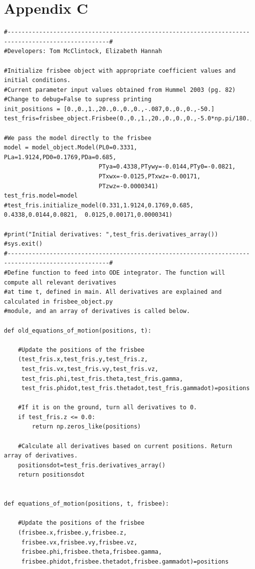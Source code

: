 \documentclass[a4paper,12pt, oneside]{article}
\begin{document}
\section*{Appendix C}
\begin{verbatim}
#---------------------------------------------------------------------------------------------------#
#Developers: Tom McClintock, Elizabeth Hannah

#Initialize frisbee object with appropriate coefficient values and initial conditions.
#Current parameter input values obtained from Hummel 2003 (pg. 82)
#Change to debug=False to supress printing
init_positions = [0.,0.,1.,20.,0.,0.,0.,-.087,0.,0.,0.,-50.]
test_fris=frisbee_object.Frisbee(0.,0.,1.,20.,0.,0.,0.,-5.0*np.pi/180.,0.,0.,0.,-50.,debug=False)

#We pass the model directly to the frisbee
model = model_object.Model(PL0=0.3331, PLa=1.9124,PD0=0.1769,PDa=0.685,
                           PTya=0.4338,PTywy=-0.0144,PTy0=-0.0821,
                           PTxwx=-0.0125,PTxwz=-0.00171,
                           PTzwz=-0.0000341)
test_fris.model=model
#test_fris.initialize_model(0.331,1.9124,0.1769,0.685,  0.4338,0.0144,0.0821,  0.0125,0.00171,0.0000341)

#print("Initial derivatives: ",test_fris.derivatives_array())
#sys.exit()
#---------------------------------------------------------------------------------------------------#
#Define function to feed into ODE integrator. The function will compute all relevant derivatives
#at time t, defined in main. All derivatives are explained and calculated in frisbee_object.py
#module, and an array of derivatives is called below.

def old_equations_of_motion(positions, t):

    #Update the positions of the frisbee
    (test_fris.x,test_fris.y,test_fris.z,
     test_fris.vx,test_fris.vy,test_fris.vz,
     test_fris.phi,test_fris.theta,test_fris.gamma,
     test_fris.phidot,test_fris.thetadot,test_fris.gammadot)=positions
    
    #If it is on the ground, turn all derivatives to 0.
    if test_fris.z <= 0.0:
        return np.zeros_like(positions)

    #Calculate all derivatives based on current positions. Return array of derivatives.
    positionsdot=test_fris.derivatives_array()
    return positionsdot


def equations_of_motion(positions, t, frisbee):

    #Update the positions of the frisbee
    (frisbee.x,frisbee.y,frisbee.z,
     frisbee.vx,frisbee.vy,frisbee.vz,
     frisbee.phi,frisbee.theta,frisbee.gamma,
     frisbee.phidot,frisbee.thetadot,frisbee.gammadot)=positions


\end{verbatim}
\end{document}
